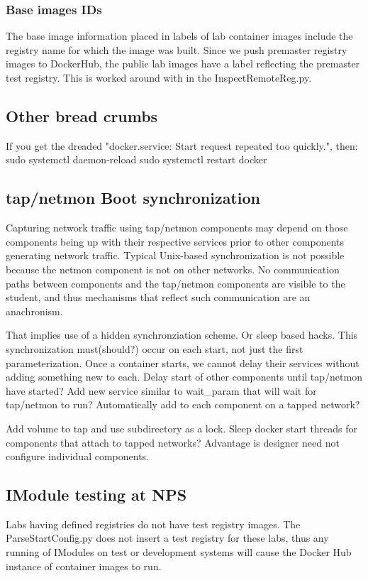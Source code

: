 \documentclass[12pt]{article}
\begin{document}
\subsubsection {Base images IDs}
The base image information placed in labels of lab container images include the registry name for which the image was built.  Since we push
premaster registry images to DockerHub, the public lab images have a label reflecting the premaster test registry.
This is worked around with in the InspectRemoteReg.py.  

\subsection{Other bread crumbs}
If you get the dreaded "docker.service: Start request repeated too quickly.", then:
sudo systemctl daemon-reload
sudo systemctl restart docker

\subsection{tap/netmon Boot synchronization}
Capturing network traffic using tap/netmon components may depend on those components being up with their respective
services prior to other components generating network traffic.  Typical Unix-based synchronization is not possible
because the netmon component is not on other networks.  No communication paths between components and the tap/netmon
components are visible to the student, and thus mechanisms that reflect such communication are an anachronism.

That implies use of a hidden synchronziation scheme.  Or sleep based hacks.  This synchronization must(should?) occur on 
each start, not just the first parameterization.  Once a container starts, we cannot delay their services without adding
something new to each.
Delay start of other components until tap/netmon have started?
Add new service similar to wait\_param that will wait for tap/netmon to run?  Automatically add to each component
on a tapped network?

Add volume to tap and use subdirectory as a lock.  Sleep docker start threads for components that attach to
tapped networks?  Advantage is designer need not configure individual components.  

\subsection{IModule testing at NPS}
Labs having defined registries do not have test registry images.  The ParseStartConfig.py does not insert a test registry
for these labs, thus any running of IModules on test or development systems will cause the Docker Hub instance of container
images to run.
\end{document}
